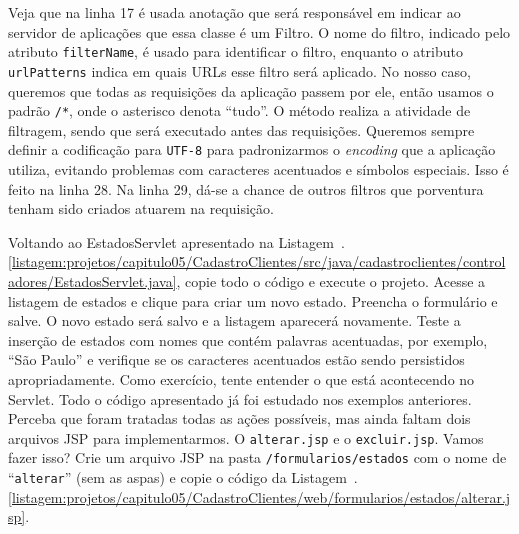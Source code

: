 
Veja que na linha 17 é usada anotação  que será responsável em indicar ao servidor de aplicações que essa classe é um Filtro. O nome do filtro, indicado pelo atributo \texttt{filterName}, é usado para identificar o filtro, enquanto o atributo \texttt{urlPatterns} indica em quais URLs esse filtro será aplicado. No nosso caso, queremos que todas as requisições da aplicação passem por ele, então usamos o padrão \texttt{/*}, onde o asterisco denota ``tudo''. O método  realiza a atividade de filtragem, sendo que será executado antes das requisições. Queremos sempre definir a codificação para \texttt{UTF-8} para padronizarmos o \textit{encoding} que a aplicação utiliza, evitando problemas com caracteres acentuados e símbolos especiais. Isso é feito na linha 28. Na linha 29, dá-se a chance de outros filtros que porventura tenham sido criados atuarem na requisição.

Voltando ao EstadosServlet apresentado na Listagem~\thechapter.\ref{listagem:projetos/capitulo05/CadastroClientes/src/java/cadastroclientes/controladores/EstadosServlet.java}, copie todo o código e execute o projeto. Acesse a listagem de estados e clique para criar um novo estado. Preencha o formulário e salve. O novo estado será salvo e a listagem aparecerá novamente. Teste a inserção de estados com nomes que contém palavras acentuadas, por exemplo, ``São Paulo'' e verifique se os caracteres acentuados estão sendo persistidos apropriadamente. Como exercício, tente entender o que está acontecendo no Servlet. Todo o código apresentado já foi estudado nos exemplos anteriores. Perceba que foram tratadas todas as ações possíveis, mas ainda faltam dois arquivos JSP para implementarmos. O \texttt{alterar.jsp} e o \texttt{excluir.jsp}. Vamos fazer isso? Crie um arquivo JSP na pasta \texttt{/formularios/estados} com o nome de ``\texttt{alterar}'' (sem as aspas) e copie o código da Listagem~\thechapter.\ref{listagem:projetos/capitulo05/CadastroClientes/web/formularios/estados/alterar.jsp}.



